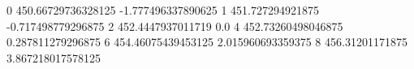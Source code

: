 0 450.66729736328125 -1.777496337890625
1 451.727294921875 -0.717498779296875
2 452.4447937011719 0.0
4 452.73260498046875 0.287811279296875
6 454.46075439453125 2.015960693359375
8 456.31201171875 3.867218017578125
